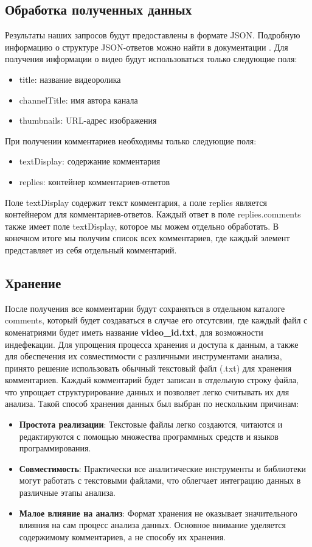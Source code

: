 	\subsection{Обработка полученных данных}
		Результаты наших запросов будут предоставлены в формате JSON. Подробную информацию о структуре JSON-ответов можно найти в документации \cite{YouTubeAPI}. Для получения информации о видео будут использоваться только следующие поля:
		\begin{itemize}
			\item title: название видеоролика
			\item channelTitle: имя автора канала
			\item thumbnails: URL-адрес изображения
		\end{itemize}				
		 При получении комментариев необходимы только следующие поля:
		 \begin{itemize}
		 	\item textDisplay: содержание комментария
		 	\item replies: контейнер комментариев-ответов
		 \end{itemize}
 		 Поле textDisplay содержит текст комментария, а поле replies является контейнером для комментариев-ответов. Каждый ответ в поле replies.comments также имеет поле textDisplay, которое мы можем отдельно обработать. 
		В конечном итоге мы получим список всех комментариев, где каждый элемент представляет из себя отдельный комментарий.
		
	\subsection{Хранение}
		После получения все комментарии будут сохраняться в отдельном каталоге comments, который будет создаваться в случае его отсутсвии, где каждый файл с коменатриями будет иметь название \textbf{video\_id.txt}, для возможности индефекации.		
		Для упрощения процесса хранения и доступа к данным, а также для обеспечения их совместимости с различными инструментами анализа, принято решение использовать обычный текстовый файл (.txt) для хранения комментариев. Каждый комментарий будет записан в отдельную строку файла, что упрощает структурирование данных и позволяет легко считывать их для анализа.
	Такой способ хранения данных был выбран по нескольким причинам:
	\begin{itemize}
		\item \textbf{Простота реализации}: Текстовые файлы легко создаются, читаются и редактируются с помощью множества программных средств и языков программирования.
		\item \textbf{Совместимость}: Практически все аналитические инструменты и библиотеки могут работать с текстовыми файлами, что облегчает интеграцию данных в различные этапы анализа.
		\item \textbf{Малое влияние на анализ}: Формат хранения не оказывает значительного влияния на сам процесс анализа данных. Основное внимание уделяется содержимому комментариев, а не способу их хранения.
	\end{itemize}

